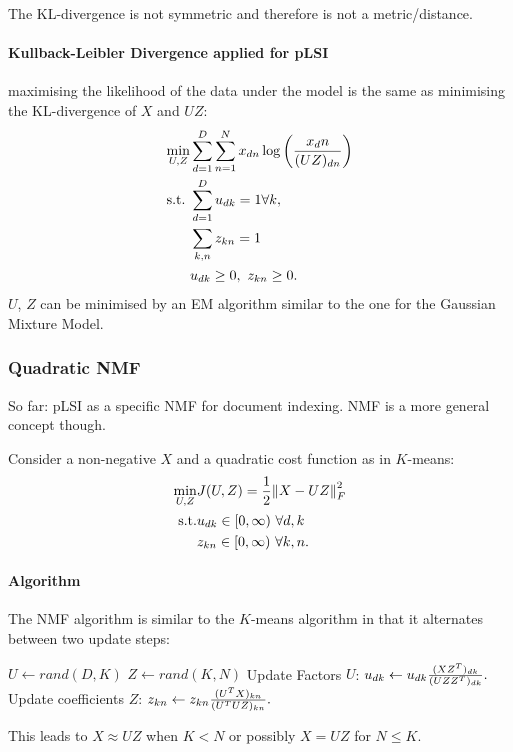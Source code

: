The KL-divergence is not symmetric and therefore is not a metric/distance.

\paragraph{Kullback-Leibler Divergence applied for pLSI} maximising the likelihood of the data under the model is the same as minimising the KL-divergence of $X$ and $UZ$:
\begin{align*}
    \min_{U,Z} &\sum_{d=1}^D\sum_{n=1}^N x_{dn} \log\left({x_dn\over (UZ)_{dn}}\right)\\
    \text{s.t.}\ & \sum_{d=1} ^D u_{dk} = 1\forall k,\\
    &\sum_{k,n} z_{kn} =1\\
    &u_{dk} \geq 0,\ z_{kn} \geq 0.
\end{align*}
$U$, $Z$ can be minimised by an EM algorithm similar to the one for the Gaussian Mixture Model.

\subsubsection{Quadratic NMF}
So far: pLSI as a specific NMF for document indexing. NMF is a more general concept though. 

Consider a non-negative $X$ and a quadratic cost function as in $K$-means:
\begin{align*}
     \min_{U,Z}& J(U,Z) = {1\over 2} \norm{X-UZ}_F^2\\
     \text{s.t.}& u_{dk} \in [0,\infty)\ \forall d,k\\
     &z_{kn} \in [0,\infty)\ \forall k, n.
\end{align*}


\paragraph{Algorithm} The NMF algorithm is similar to the $K$-means algorithm in that it alternates between two update steps:
\begin{algorithmic}
\STATE $U \gets rand(D,K)$
\STATE $Z \gets rand(K,N)$
    \STATE Update Factors $U$: $u_{dk} \gets u_{dk} {(XZ^T)_{dk}\over (UZZ^T)_{dk}}.$
    \STATE Update coefficients $Z$: $z_{kn} \gets z_{kn} {(U^TX)_{kn}\over (U^TUZ)_{kn}}.$

\ENDFOR
\end{algorithmic}
This leads to $X\approx UZ$ when $K<N$ or possibly $X=UZ$ for $N\leq K$.

